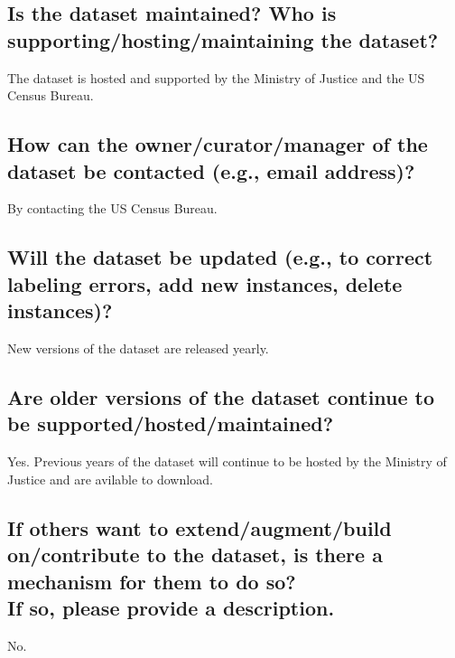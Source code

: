\documentclass[letterpaper, 10 pt, conference]{ieeeconf}  %
\newcommand{\subtitle}[1]{{\\ \small \normalfont \color{purple} #1}}
\begin{document}
\subsection{Is the dataset maintained? Who is supporting/hosting/maintaining the dataset?}

The dataset is hosted and supported by the Ministry of Justice and the US Census Bureau.

\subsection{How can the owner/curator/manager of the dataset be contacted (e.g., email address)?}

By contacting the US Census Bureau.

\subsection{Will the dataset be updated (e.g., to correct labeling errors, add new instances, delete instances)?}

New versions of the dataset are released yearly.

\subsection{Are older versions of the dataset continue to be supported/hosted/maintained?}

Yes. Previous years of the dataset will continue to be hosted by the Ministry of Justice and are avilable to download. 

\subsection{If others want to extend/augment/build on/contribute to the dataset, is there a mechanism for them to do so? \subtitle{If so, please provide a description.}}

No.

\medskip
 
  

\end{document}
